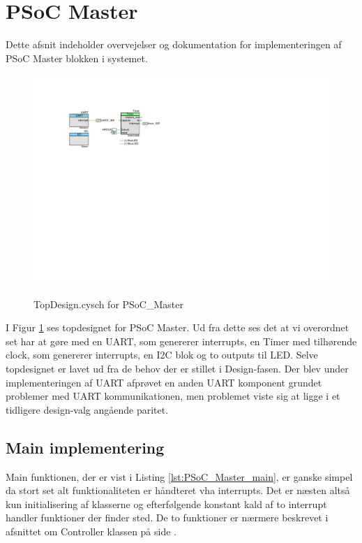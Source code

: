 \section{PSoC Master} \label{sec:PSoC_Master_impl}
Dette afsnit indeholder overvejelser og dokumentation for implementeringen af PSoC Master blokken i systemet.

\begin{figure}[h]
\centering
\includegraphics[width=\textwidth*3/5, trim=100 380 500 100, clip=true]{../fig/TopDesign_PSoC_Master}
\label{fig:psoc_master_topdesign}
\caption{TopDesign.cysch for PSoC\_Master}
\end{figure}
  
I Figur \ref{fig:psoc_master_topdesign} ses topdesignet for PSoC Master. Ud fra dette ses det at vi overordnet set har at gøre med en UART, som genererer interrupts, en Timer med tilhørende clock, som genererer interrupts, en I2C blok og to outputs til LED. 
Selve topdesignet er lavet ud fra de behov der er stillet i Design-fasen. Der blev under implementeringen af UART afprøvet en anden UART komponent grundet problemer med UART kommunikationen, men problemet viste sig at ligge i et tidligere design-valg angående paritet.



\subsection{Main implementering}
Main funktionen, der er vist i Listing \ref{lst:PSoC_Master_main}, er ganske simpel da stort set alt funktionaliteten er håndteret vha interrupts. 
Det er næsten altså kun initialisering af klasserne og efterfølgende konstant kald af to interrupt handler funktioner der finder sted. 
De to funktioner er nærmere beskrevet i afsnittet om Controller klassen på side \pageref{sec:Controller_impl}.

